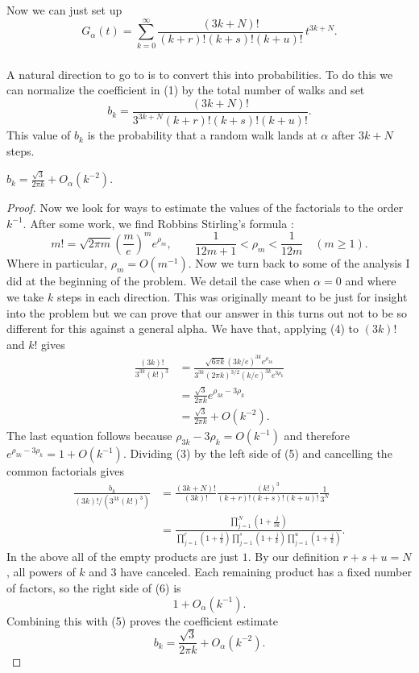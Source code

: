 \documentclass[11pt]{scrartcl}
\begin{document}
\begin{soln}
Now we can just set up	\[
	G_\alpha(t)
	=\sum_{k=0}^{\infty}
	\frac{(3k+N)!}{(k+r)!(k+s)!(k+u)!}\,t^{3k+N}.
	\tag{2}
	\]
	
	
	\subsubsection*{}
	A natural direction to go to is to convert this into probabilities. 
	To do this we can normalize the coefficient in (1) by the total number of walks and set
	\[
	b_k=
	\frac{(3k+N)!}
	{3^{3k+N}(k+r)!(k+s)!(k+u)!}.
	\tag{3}
	\]
	This value of $b_k$ is the probability that a random walk lands at  $\alpha$ after $3k+N$ steps.
    \begin{claim*}
        $b_k=\frac{\sqrt3}{2\pi k}+O_\alpha(k^{-2}).$
    \end{claim*}
    \begin{proof}
 
    Now we look for ways to estimate the values of the factorials
	to the order $k^{-1}$.
    After some work, we find Robbins
	Stirling's formula \cite[equations~(1)--(2)]{robbins-stirling} : 
	\[
	m!=\sqrt{2\pi m}\left(\frac{m}{e}\right)^m e^{\rho_m},
	\qquad
	\frac{1}{12m+1}<\rho_m<\frac{1}{12m}
	\quad(m\ge1).
	\tag{4}
	\]
	Where in particular, $\rho_m=O(m^{-1})$. Now we turn back to some of the analysis I did at the 
    beginning of the problem. We detail the case when $\alpha = 0$ and where we take $k$ steps in each direction. This was originally meant to be just for insight into the problem but we can prove that our answer in this turns out not to be so different for this against a general alpha. We have that, applying (4) to
	$(3k)!$ and $k!$ gives
	\begin{align*}
		\frac{(3k)!}{3^{3k}(k!)^3}
		&=
		\frac{
			\sqrt{6\pi k}(3k/e)^{3k}e^{\rho_{3k}}
		}{
			3^{3k}(2\pi k)^{3/2}(k/e)^{3k}e^{3\rho_k}
		}\\
		&=\frac{\sqrt3}{2\pi k}
		e^{\rho_{3k}-3\rho_k}\\
		&=\frac{\sqrt3}{2\pi k}+O(k^{-2}).
		\tag{5}
	\end{align*}
	The last equation follows because
	$\rho_{3k}-3\rho_k=O(k^{-1})$ and therefore
	$e^{\rho_{3k}-3\rho_k}=1+O(k^{-1})$.
	Dividing (3) by the left side of (5) and
cancelling the common factorials gives
	\begin{align*}
		\frac{b_k}{(3k)!/(3^{3k}(k!)^3)}
		&=
		\frac{(3k+N)!}{(3k)!}
		\frac{(k!)^3}{(k+r)!(k+s)!(k+u)!}
		\frac1{3^N}\\
		&=
		\frac{
			\displaystyle\prod_{j=1}^{N}\left(1+\frac{j}{3k}\right)
		}{
			\displaystyle
			\prod_{j=1}^{r}\left(1+\frac{j}{k}\right)
			\prod_{j=1}^{s}\left(1+\frac{j}{k}\right)
			\prod_{j=1}^{u}\left(1+\frac{j}{k}\right)
		}.
		\tag{6}
	\end{align*}
	In the above all of the empty products are just $1$. By our definition $r+s+u=N$, all powers
	of $k$ and $3$ have canceled. Each remaining product has a fixed number
	of factors, so the right side of (6) is
	\[
	1+O_\alpha(k^{-1}).
	\]
	Combining this with (5) proves the coefficient estimate
	\[
	\boxed{
		b_k=\frac{\sqrt3}{2\pi k}+O_\alpha(k^{-2}).
	}
	\tag{7}
	\]
	       

\end{proof}
\end{soln}
\end{document}
